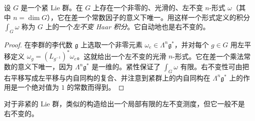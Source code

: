 \documentclass[../../main.tex]{subfiles}
\begin{document}
\begin{proposition}\label{proposition:ch16-haar-measure}
设 $G$ 是一个紧 Lie 群。在 $G$ 上存在一个非零的、光滑的、左不变 $n$-形式 $\omega$（其中 $n=\dim G$），它在差一个常数因子的意义下唯一。用这样一个形式定义的积分 $\int_G\omega$ 称为 $G$ 上的一个\emph{左不变 Haar 积分}。它自动地也是右不变的。
\end{proposition}

\begin{proof}在李群的李代数 $\mathfrak{g}$ 上选取一个非零元素 $\omega_e\in\Lambda^n\mathfrak{g}^*$，并对每个 $g\in G$ 用左平移定义 $\omega_g=(L_{g^{-1}})^*\omega_e$。这就给出一个左不变的光滑 $n$-形式。它在差一个乘法常数的意义下唯一，因为 $\Lambda^n\mathfrak{g}^*$ 是一维的。紧性保证了 $\int_G\omega$ 有限。右不变性可由把右平移写成左平移与内自同构的复合、并注意到紧群上的内自同构在 $\Lambda^n\mathfrak{g}^*$ 上的作用是一个绝对值为 $1$ 的常数而得到。
\end{proof}

\begin{remark}
对于非紧的 Lie 群，类似的构造给出一个局部有限的左不变测度，但它一般不是右不变的。
\end{remark}
\end{document}
